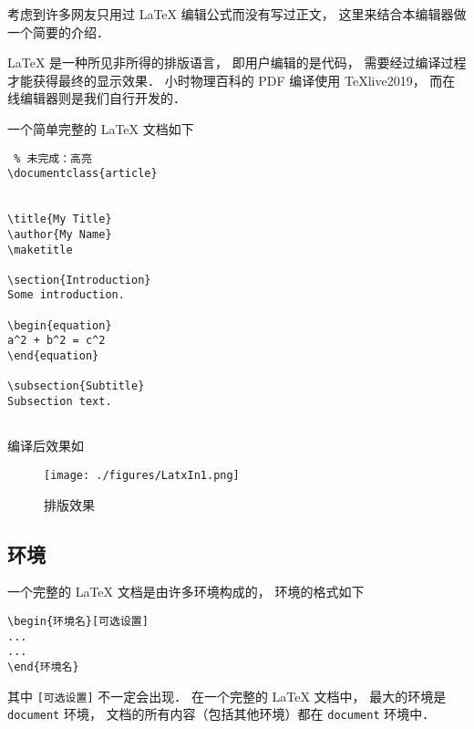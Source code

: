 
考虑到许多网友只用过 LaTeX 编辑公式而没有写过正文， 这里来结合本编辑器做一个简要的介绍．

LaTeX 是一种所见非所得的排版语言， 即用户编辑的是代码， 需要经过编译过程才能获得最终的显示效果． 小时物理百科的 PDF 编译使用 TeXlive2019， 而在线编辑器则是我们自行开发的．

一个简单完整的 LaTeX 文档如下
\begin{lstlisting} % 未完成：高亮
\documentclass{article}


\title{My Title}
\author{My Name}
\maketitle

\section{Introduction}
Some introduction.

\begin{equation}
a^2 + b^2 = c^2
\end{equation}

\subsection{Subtitle}
Subsection text.


\end{lstlisting}

编译后效果如
\begin{figure}[ht]
\centering
\texttt{[image: ./figures/LatxIn1.png]}
\caption{排版效果} \label{latxIn_fig1}
\end{figure}

\subsection{环境}
一个完整的 LaTeX 文档是由许多环境构成的， 环境的格式如下
\begin{lstlisting}
\begin{环境名}[可选设置]
...
...
\end{环境名}
\end{lstlisting}
其中 \lstinline|[可选设置]| 不一定会出现． 在一个完整的 LaTeX 文档中， 最大的环境是 \lstinline|document| 环境， 文档的所有内容（包括其他环境）都在 \lstinline|document| 环境中． 